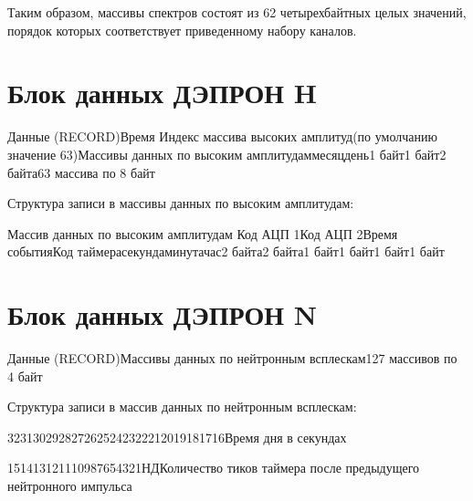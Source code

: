 {Таким образом, массивы спектров состоят из 62 четырехбайтных целых значений, порядок которых соответствует приведенному набору каналов.




\section{Блок данных ДЭПРОН H}


{\footnotesize Данные (RECORD)Время Индекс массива высоких амплитуд(по умолчанию значение 63)Массивы данных по высоким амплитудаммесяцдень1 байт1 байт2 байта63 массива  по 8 байт}



Структура записи в массивы данных по высоким амплитудам:



{\footnotesize Массив данных по высоким амплитудам Код АЦП 1Код АЦП 2Время событияКод таймерасекундаминутачас2 байта2 байта1 байт1 байт1 байт1 байт}


\begin{flushleft}
	
\end{flushleft}


\begin{flushleft}
	\newpage
	
\end{flushleft}


\section{Блок данных ДЭПРОН N}

\begin{flushleft}
	
\end{flushleft}


{\footnotesize Данные (RECORD)Массивы данных по нейтронным всплескам127 массивов  по 4 байт}


\begin{flushleft}
	Структура записи в массив данных по нейтронным всплескам:
\end{flushleft}


3231302928272625242322212019181716{\small Время дня в секундах}


\begin{flushleft}
	
\end{flushleft}


151413121110987654321{\small НДКоличество тиков таймера после предыдущего нейтронного импульса}


}
